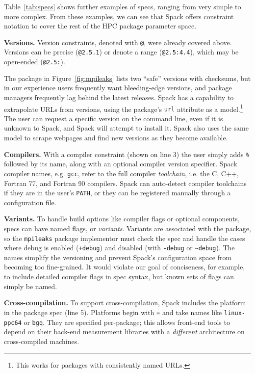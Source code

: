 Table~\ref{tab:specs} shows further examples of specs, ranging from very
simple to more complex. From these examples, we can see that Spack offers constraint
notation to cover the rest of the HPC package parameter space.

{\bf Versions.}
Version constraints, denoted with {\tt @}, were already covered above. Versions
can be precise ({\tt @2.5.1}) or denote a range ({\tt @2.5:4.4}),
which may be open-ended ({\tt @2.5:}).

The package in Figure~\ref{fig:mpileaks} lists two ``safe'' versions with checksums, but
in our experience users frequently want bleeding-edge versions, and package managers
frequently lag behind the latest releases.
Spack has a capability to extrapolate URLs from versions,
using the package's {\tt url} attribute as a model.\footnote{This works
for packages with consistently named URLs.}  The user can request a specific
version on the command line, even if it is unknown to Spack,
and Spack will attempt to install it.  Spack also uses the same
model to scrape webpages and find new versions as they become available.

{\bf Compilers.}
With a compiler constraint (shown on line 3) the user
simply adds {\tt \%} followed by its name, along with an optional compiler version
specifier.  Spack compiler names, e.g. {\tt gcc}, refer to the full compiler {\it toolchain},
i.e. the C, C++, Fortran 77, and Fortran 90 compilers.  Spack can auto-detect
compiler toolchains if they are in the user's {\tt PATH}, or they can be registered manually
through a configuration file.

{\bf Variants.}
To handle build options like compiler flags or optional components, specs can
have named flags, or {\it variants}.  Variants are associated with the package,
so the {\tt mpileaks} package implementor must check the spec and handle the cases
where debug is enabled ({\tt +debug}) and disabled (with {\tt -debug}
or {\tt \textasciitilde \ignorespaces debug}).  The names simplify the versioning and prevent
Spack's configuration space from becoming too fine-grained.
It would violate our goal of conciseness, for example, to include detailed
compiler flags in spec syntax, but known sets of flags can simply be named.

{\bf Cross-compilation.}
To support cross-compilation, Spack includes the platform in the package spec (line 5).
Platforms begin with {\tt =} and take names like {\tt linux-ppc64} or {\tt bgq}.  They are
specified per-package; this allows front-end tools to depend on their back-end measurement
libraries with a {\it different} architecture on cross-compiled machines.

